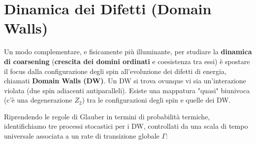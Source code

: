 \section{Dinamica dei Difetti (Domain Walls)}
Un modo complementare, e fisicamente più illuminante, per studiare la \textbf{dinamica di coarsening} (\textbf{crescita dei domini ordinati} e coesistenza tra essi) è spostare il focus dalla configurazione degli spin all'evoluzione dei difetti di energia, chiamati \textbf{Domain Walls (DW)}.
Un DW si trova ovunque vi sia un'interazione violata (due spin adiacenti antiparalleli). Esiste una mappatura "quasi" biunivoca (c'è una degenerazione $Z_2$) tra le configurazioni degli spin e quelle dei DW.

Riprendendo le regole di Glauber in termini di probabilità termiche, identifichiamo tre processi stocastici per i DW, controllati da una scala di tempo universale associata a un rate di transizione globale $\Gamma$:

